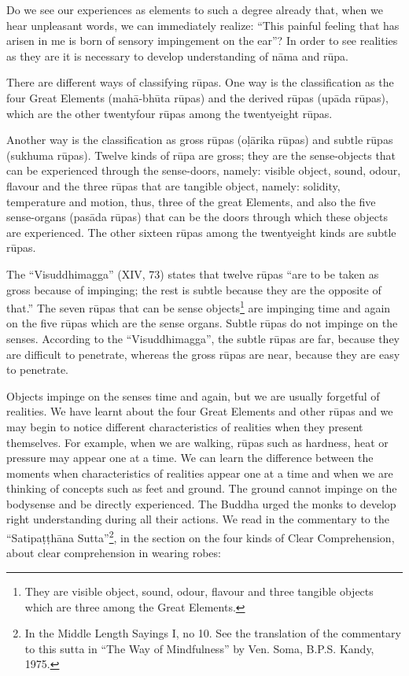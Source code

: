 \documentclass{book}
\begin{document}
Do we see our experiences as elements to such a degree already that,
when we hear unpleasant words, we can immediately realize: ``This
painful feeling that has arisen in me is born of sensory impingement on
the ear''? In order to see realities as they are it is necessary to
develop understanding of n{\=a}ma and r\=upa. 

There are different ways of classifying r\=upas. One way is the
classification as the four Great Elements (mah{\=a}-bh\=uta r\=upas)
and the derived r\=upas (up{\=a}da r\=upas), which are the other
twentyfour r\=upas among the twentyeight r\=upas.

Another way is the classification as gross r\=upas (o\d l{\=a}rika
r\=upas) and subtle r\=upas (sukhuma r\=upas). Twelve kinds of r\=upa
are gross; they are the sense-objects that can be experienced through
the sense-doors, namely: visible object, sound, odour, flavour and
the three r\=upas that are tangible object, namely: solidity,
temperature and motion, thus, three of the great Elements, and also the
five sense-organs (pas{\=a}da r\=upas) that can be the doors through
which these objects are experienced. The other sixteen r\=upas among
the twentyeight kinds are subtle r\=upas. 

The ``Visuddhimagga'' (XIV, 73) states that twelve r\=upas ``are to be
taken as gross because of impinging; the rest is subtle because they
are the opposite of that.'' The seven r\=upas that can be sense
objects\footnote{They are visible object, sound, odour, flavour and
three tangible objects which are three among the Great Elements. } are
impinging time and again on the five r\=upas which are the sense
organs. Subtle r\=upas do not impinge on the senses. According to the
``Visuddhimagga'', the subtle r\=upas are far, because they are
difficult to penetrate, whereas the gross r\=upas are near, because
they are easy to penetrate. 

Objects impinge on the senses time and again, but we are usually
forgetful of realities. We have learnt about the four Great Elements
and other r\=upas and we may begin to notice different characteristics
of realities when they present themselves. For example, when we are
walking, r\=upas such as hardness, heat or pressure may appear one at a
time. We can learn the difference between the moments when
characteristics of realities appear one at a time and when we are
thinking of concepts such as feet and ground. The ground cannot impinge
on the bodysense and be directly experienced. The Buddha urged the
monks to develop right understanding during all their actions. We read
in the commentary to the ``Satipa\d t\d th{\=a}na Sutta''\footnote{In
the Middle Length Sayings I, no 10. See the translation of the
commentary to this sutta in ``The Way of Mindfulness'' by Ven. Soma,
B.P.S. Kandy, 1975.}, in the section on the four kinds of Clear
Comprehension, about clear comprehension in wearing robes:
\end{document}
